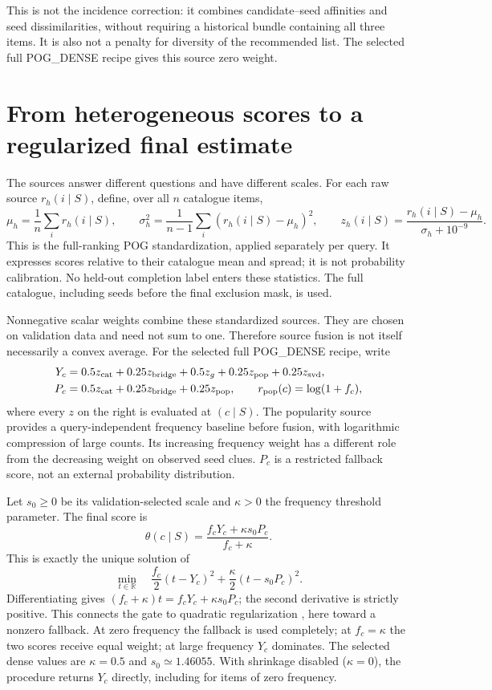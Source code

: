 \documentclass[11pt,a4paper]{article}
\begin{document}
This is not the incidence correction: it combines candidate--seed affinities
and seed dissimilarities, without requiring a historical bundle containing
all three items. It is also not a penalty for diversity of the recommended
list. The selected full POG\_DENSE recipe gives this source zero weight.

\section{From heterogeneous scores to a regularized final estimate}
The sources answer different questions and have different scales.
For each raw source $r_h(i\mid S)$, define, over all $n$ catalogue items,
\[
 \mu_h=\frac1n\sum_i r_h(i\mid S),\qquad
 \sigma_h^2=\frac1{n-1}\sum_i(r_h(i\mid S)-\mu_h)^2,\qquad
 z_h(i\mid S)=\frac{r_h(i\mid S)-\mu_h}{\sigma_h+10^{-9}}.
\]
This is the full-ranking POG standardization, applied separately per query.
It expresses scores relative to their catalogue mean and spread; it is not
probability calibration. No held-out completion label enters these statistics.
The full catalogue, including seeds before the final exclusion mask, is used.

Nonnegative scalar weights combine these standardized sources. They are chosen
on validation data and need not sum to one. Therefore source fusion is not
itself necessarily a convex average. For the selected full POG\_DENSE recipe,
write
\begin{align}
 Y_c&=0.5z_{\rm cat}+0.25z_{\rm bridge}+0.5z_g
          +0.25z_{\rm pop}+0.25z_{\rm svd},\\
 P_c&=0.5z_{\rm cat}+0.25z_{\rm bridge}+0.25z_{\rm pop},
 \qquad r_{\rm pop}(c)=\log(1+f_c),
\end{align}
where every $z$ on the right is evaluated at $(c\mid S)$.
The popularity source provides a query-independent frequency baseline before
fusion, with logarithmic compression of large counts. Its increasing frequency
weight has a different role from the decreasing weight on observed seed clues.
$P_c$ is a restricted fallback score, not an external probability distribution.

Let $s_0\geq0$ be its validation-selected scale and $\kappa>0$ the frequency
threshold parameter. The final score is
\begin{equation}\label{shrink}
 \boxed{\theta(c\mid S)=\frac{f_cY_c+\kappa s_0P_c}{f_c+\kappa}.}
\end{equation}
This is exactly the unique solution of
\begin{equation}
 \min_{t\in\mathbb R}\quad
 \frac{f_c}{2}(t-Y_c)^2+\frac{\kappa}{2}(t-s_0P_c)^2.
\end{equation}
Differentiating gives $(f_c+\kappa)t=f_cY_c+\kappa s_0P_c$;
the second derivative is strictly positive. This connects the gate to
quadratic regularization \cite{ridge}, here toward a nonzero fallback.
At zero frequency the fallback is used completely; at $f_c=\kappa$ the
two scores receive equal weight; at large frequency $Y_c$ dominates.
The selected dense values are $\kappa=0.5$ and $s_0\simeq1.46055$.
With shrinkage disabled ($\kappa=0$), the procedure returns $Y_c$ directly,
including for items of zero frequency.
\end{document}
